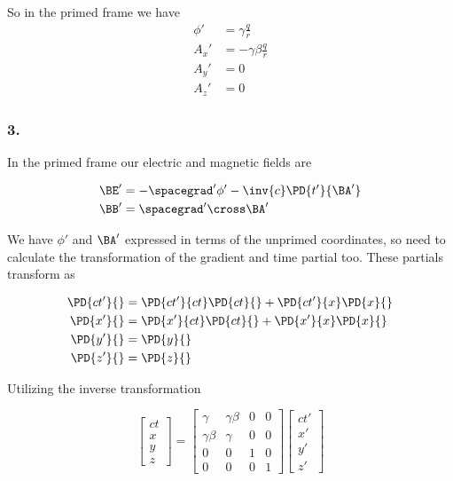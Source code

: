 So in the primed frame we have
\begin{align}\label{eqn:relElectroDynProblemSet2:n}
\phi' &= \gamma \frac{q}{r} \\
A_x' &= -\gamma \beta \frac{q}{r} \\
A_y' &= 0 \\
A_z' &= 0 
\end{align}

\subsubsection{3.}

In the primed frame our electric and magnetic fields are

\begin{align}\label{eqn:relElectroDynProblemSet2:n}
\BE' &= - \spacegrad' \phi' - \inv{c} \PD{t'}{\BA'} \\
\BB' &= \spacegrad' \cross \BA'
\end{align}

We have $\phi'$ and $\BA'$ expressed in terms of the unprimed coordinates, so need to calculate the transformation of the gradient and time partial too.  These partials transform as

\begin{align}\label{eqn:relElectroDynProblemSet2:n}
\PD{c t'}{} &= \PD{ct'}{ct} \PD{ct}{} + \PD{ct'}{x} \PD{x}{} \\
\PD{x'}{} &= \PD{x'}{ct} \PD{ct}{} + \PD{x'}{x} \PD{x}{} \\
\PD{y'}{} &= \PD{y}{} \\
\PD{z'}{} &= \PD{z}{}
\end{align}

Utilizing the inverse transformation 

\begin{equation}\label{eqn:relElectroDynProblemSet2:n}
\begin{bmatrix}
ct \\
x \\
y \\
z
\end{bmatrix}
=
\begin{bmatrix}
\gamma & \gamma \beta & 0 & 0 \\
\gamma \beta & \gamma & 0 & 0 \\
0 & 0 & 1 & 0 \\
0 & 0 & 0 & 1 
\end{bmatrix}
\begin{bmatrix}
ct' \\
x' \\
y' \\
z'
\end{bmatrix}
\end{equation}

